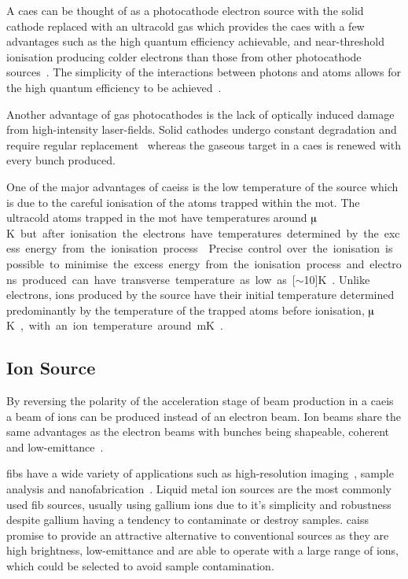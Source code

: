A \gls{caes} can be thought of as a photocathode electron source with the solid cathode replaced with an ultracold gas which provides the \gls{caes} with a few advantages such as the high quantum efficiency achievable, and near-threshold ionisation producing colder electrons than those from other photocathode sources~\cite{engelen_effective_2014}.
The simplicity of the interactions between photons and atoms allows for the high quantum efficiency to be achieved~\cite{baranov_field_1994}.

Another advantage of gas photocathodes is the lack of optically induced damage from high-intensity laser-fields.
Solid cathodes undergo constant degradation and require regular replacement~\cite{dowell_results_1995} whereas the gaseous target in a \gls{caes} is renewed with every bunch produced.

One of the major advantages of \glspl{caeis} is the low temperature of the source which is due to the careful ionisation of the atoms trapped within the \gls{mot}.
The ultracold atoms trapped in the \gls{mot} have temperatures around \unit[100]{$\muup$K} but after ionisation the electrons have temperatures determined by the excess energy from the ionisation process~\cite{engelen_high-coherence_2013,engelen_analytical_2014,sparkes_high-coherence_2014,speirs_identification_2017}.
Precise control over the ionisation is possible to minimise the excess energy from the ionisation process and electrons produced can have transverse temperature as low as \unit[$\sim$10]{K}~\cite{saliba_spatial_2012}.
Unlike electrons, ions produced by the source have their initial temperature determined predominantly by the temperature of the trapped atoms before ionisation, \unit[100]{$\muup$K}, with an ion temperature around \unit[1]{mK}~\cite{debernardi_measurement_2011,murphy_detailed_2014}.

\subsection{Ion Source}

By reversing the polarity of the acceleration stage of beam production in a \gls{caeis} a beam of ions can be produced instead of an electron beam.
Ion beams share the same advantages as the electron beams with bunches being shapeable, coherent and low-emittance~\cite{knuffman_cold_2013}.

\Glspl{fib} have a wide variety of applications such as high-resolution imaging~\cite{scipioni_helium_2008}, sample analysis and nanofabrication~\cite{khizroev_focused-ion-beam-based_2004}.
Liquid metal ion sources are the most commonly used \gls{fib} sources, usually using gallium ions due to it's simplicity and robustness despite gallium having a tendency to contaminate or destroy samples.
\Glspl{cais} promise to provide an attractive alternative to conventional sources as they are high brightness, low-emittance and are able to operate with a large range of ions, which could be selected to avoid sample contamination.

